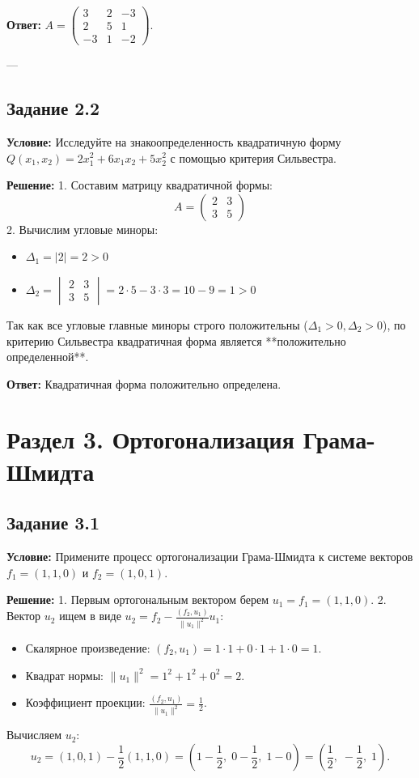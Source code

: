 \documentclass[11pt, a4paper]{article}
\begin{document}
\textbf{Ответ:} $A = \begin{pmatrix} 3 & 2 & -3 \\ 2 & 5 & 1 \\ -3 & 1 & -2 \end{pmatrix}$.

---

\subsection*{Задание 2.2}
\textbf{Условие:} Исследуйте на знакоопределенность квадратичную форму $Q(x_1, x_2) = 2x_1^2 + 6x_1x_2 + 5x_2^2$ с помощью критерия Сильвестра.

\textbf{Решение:}
1. Составим матрицу квадратичной формы:
$$ A = \begin{pmatrix} 2 & 3 \\ 3 & 5 \end{pmatrix} $$
2. Вычислим угловые миноры:
\begin{itemize}
\item $\Delta_1 = |2| = 2 > 0$
\item $\Delta_2 = \begin{vmatrix} 2 & 3 \\ 3 & 5 \end{vmatrix} = 2 \cdot 5 - 3 \cdot 3 = 10 - 9 = 1 > 0$
\end{itemize}
Так как все угловые главные миноры строго положительны ($\Delta_1 > 0, \Delta_2 > 0$), по критерию Сильвестра квадратичная форма является **положительно определенной**.

\textbf{Ответ:} Квадратичная форма положительно определена.

\newpage

\section{Раздел 3. Ортогонализация Грама-Шмидта}

\subsection*{Задание 3.1}
\textbf{Условие:} Примените процесс ортогонализации Грама-Шмидта к системе векторов $f_1 = (1, 1, 0)$ и $f_2 = (1, 0, 1)$.

\textbf{Решение:}
1. Первым ортогональным вектором берем $u_1 = f_1 = (1, 1, 0)$.
2. Вектор $u_2$ ищем в виде $u_2 = f_2 - \frac{(f_2, u_1)}{\|u_1\|^2} u_1$:
   \begin{itemize}
   \item Скалярное произведение: $(f_2, u_1) = 1\cdot 1 + 0\cdot 1 + 1\cdot 0 = 1$.
   \item Квадрат нормы: $\|u_1\|^2 = 1^2 + 1^2 + 0^2 = 2$.
   \item Коэффициент проекции: $\frac{(f_2, u_1)}{\|u_1\|^2} = \frac{1}{2}$.
   \end{itemize}
Вычисляем $u_2$:
$$ u_2 = (1, 0, 1) - \frac{1}{2}(1, 1, 0) = \left(1 - \frac{1}{2}, \; 0 - \frac{1}{2}, \; 1 - 0\right) = \left(\frac{1}{2}, \; -\frac{1}{2}, \; 1\right). $$
\end{document}
